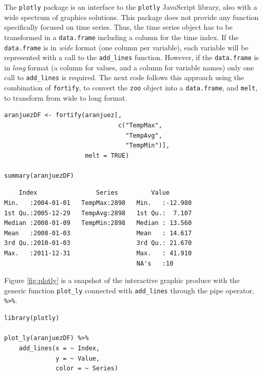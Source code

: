 The \texttt{plotly} package is an interface to the \texttt{plotly} JavaScript
library, also with a wide spectrum of graphics solutions. This package
does not provide any function specifically focused on time
series. Thus, the time series object has to be transformed in a
\texttt{data.frame} including a column for the time index. If the
\texttt{data.frame} is in \emph{wide} format (one column per variable), each
variable will be represented with a call to the \texttt{add\_lines}
function. However, if the \texttt{data.frame} is in \emph{long} format (a column
for values, and a column for variable names) only one call to
\texttt{add\_lines} is required. The next code follows this approach using the
combination of \texttt{fortify}, to convert the \texttt{zoo} object into a
\texttt{data.frame}, and \texttt{melt}, to transform from wide to long format.


\lstset{language=r,label= ,caption= ,captionpos=b,numbers=none}
\begin{lstlisting}
aranjuezDF <- fortify(aranjuez[,
                               c("TempMax",
                                 "TempAvg",
                                 "TempMin")],
                      melt = TRUE)

summary(aranjuezDF)
\end{lstlisting}

\begin{verbatim}
    Index                Series         Value        
Min.   :2004-01-01   TempMax:2898   Min.   :-12.980  
1st Qu.:2005-12-29   TempAvg:2898   1st Qu.:  7.107  
Median :2008-01-09   TempMin:2898   Median : 13.560  
Mean   :2008-01-03                  Mean   : 14.617  
3rd Qu.:2010-01-03                  3rd Qu.: 21.670  
Max.   :2011-12-31                  Max.   : 41.910  
                                    NA's   :10
\end{verbatim}


Figure \ref{fig:plotly} is a snapshot of the interactive graphic produce
with the generic function \texttt{plot\_ly} connected with \texttt{add\_lines} through
the pipe operator, \texttt{\%>\%}.


\lstset{language=r,label= ,caption= ,captionpos=b,numbers=none}
\begin{lstlisting}
library(plotly)

plot_ly(aranjuezDF) %>%
    add_lines(x = ~ Index,
              y = ~ Value,
              color = ~ Series)

\end{lstlisting}

